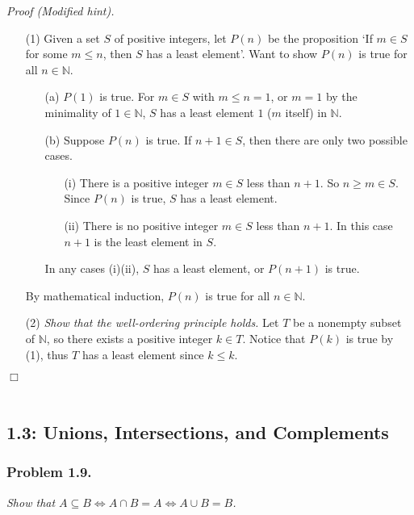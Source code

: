 \documentclass{article}
\begin{document}
\emph{Proof (Modified hint).}
\begin{enumerate}
\item[(1)]
Given a set $S$ of positive integers,
let $P(n)$ be the proposition
`If $m \in S$ for some $m \leq n$, then $S$ has a least element'.
Want to show $P(n)$ is true for all $n \in \mathbb{N}$.
\begin{enumerate}
\item[(a)]
$P(1)$ is true.
For $m \in S$ with $m \leq n = 1$,
or $m = 1$ by the minimality of $1 \in \mathbb{N}$,
$S$ has a least element $1$ ($m$ itself) in $\mathbb{N}$.
\item[(b)]
Suppose $P(n)$ is true.
If $n+1 \in S$, then there are only two possible cases.
  \begin{enumerate}
  \item[(i)]
  There is a positive integer $m \in S$ less than $n+1$.
  So $n \geq m \in S$.
  Since $P(n)$ is true, $S$ has a least element.
  \item[(ii)]
  There is no positive integer $m \in S$ less than $n+1$.
  In this case $n+1$ is the least element in $S$.
  \end{enumerate}
  In any cases (i)(ii), $S$ has a least element, or $P(n+1)$ is true.
\end{enumerate}
By mathematical induction, $P(n)$ is true for all $n \in \mathbb{N}$.
\item[(2)]
\emph{Show that the well-ordering principle holds.}
Let $T$ be a nonempty subset of $\mathbb{N}$,
so there exists a positive integer $k \in T$.
Notice that $P(k)$ is true by (1),
thus $T$ has a least element since $k \leq k$.
\end{enumerate}
$\Box$ \\\\






\subsection*{1.3: Unions, Intersections, and Complements \\}



\subsubsection*{Problem 1.9.}
\emph{Show that
$A \subseteq B
\Leftrightarrow A \cap B = A
\Leftrightarrow A \cup B = B$.} \\
\end{document}
